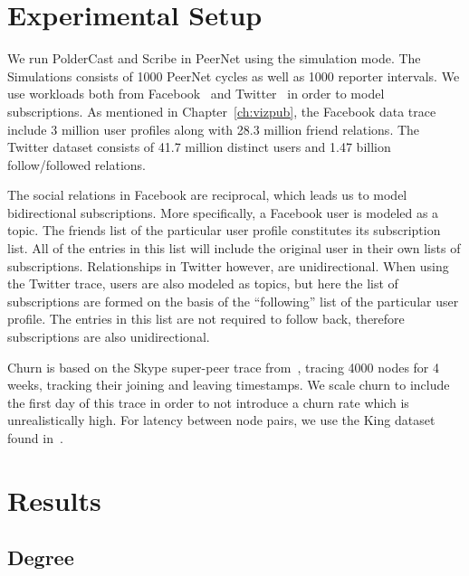 \section{Experimental Setup}

We run PolderCast and Scribe in PeerNet using the simulation mode. The
Simulations consists of 1000 PeerNet cycles as well as 1000 reporter
intervals. We use workloads both from Facebook~\cite{facebook-eurosys09} and
Twitter~\cite{Kwak10www} in order to model subscriptions. As mentioned in
Chapter~\ref{ch:vizpub}, the Facebook data trace include 3 million user
profiles along with 28.3 million friend relations. The Twitter dataset
consists of 41.7 million distinct users and 1.47 billion
follow/followed relations.

The social relations in Facebook are reciprocal, which leads us to model
bidirectional subscriptions. More specifically, a Facebook user is
modeled as a topic. The friends list of the particular user profile
constitutes its subscription list. All of the entries in this list will
include the original user in their own lists of subscriptions.
Relationships in Twitter however, are unidirectional. When using the
Twitter trace, users are also modeled as topics, but here the list of
subscriptions are formed on the basis of the ``following'' list of the
particular  user profile. The entries in this list are not required to
follow back, therefore subscriptions are also unidirectional.

Churn is based on the Skype super-peer trace from~\cite{Guha:2006}, tracing 4000
nodes for 4 weeks, tracking their joining and leaving timestamps. We
scale churn to include the first day of this trace in order to not
introduce a churn rate which is unrealistically high. For latency
between node pairs, we use the King dataset found in~\cite{king}.

\section{Results}

\subsection{Degree}

%     

